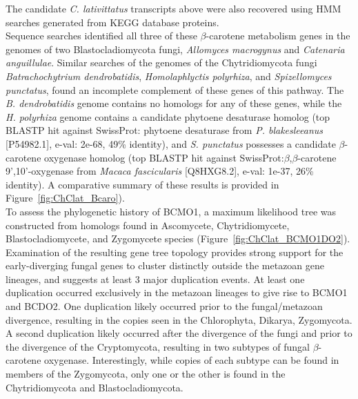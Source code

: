 \indent The candidate \textit{C. lativittatus} transcripts above were also recovered using HMM searches generated from KEGG database proteins. \\
\indent Sequence searches identified all three of these $\beta$-carotene metabolism genes in the genomes of two Blastocladiomycota fungi, \textit{Allomyces macrogynus} and \textit{Catenaria anguillulae}. Similar searches of the genomes of the Chytridiomycota fungi \textit{Batrachochytrium dendrobatidis}, \textit{Homolaphlyctis polyrhiza}, and \textit{Spizellomyces punctatus}, found an incomplete complement of these genes of this pathway. The \textit{B. dendrobatidis} genome contains no homologs for any of these genes, while the \textit{H. polyrhiza} genome contains a candidate phytoene desaturase homolog (top BLASTP hit against SwissProt: phytoene desaturase from \textit{P. blakesleeanus} [P54982.1], e-val: 2e-68, 49\% identity), and \textit{S. punctatus} possesses a candidate $\beta$-carotene oxygenase homolog (top BLASTP hit against SwissProt:$\beta$,$\beta$-carotene 9',10'-oxygenase from \textit{Macaca fascicularis} [Q8HXG8.2], e-val: 1e-37, 26\% identity). A comparative summary of these results is provided in Figure~\ref{fig:ChClat_Bcaro}). \\
\indent To assess the phylogenetic history of BCMO1, a maximum likelihood tree was constructed from homologs found in Ascomycete, Chytridiomycete, Blastocladiomycete, and Zygomycete species (Figure~\ref{fig:ChClat_BCMO1DO2}). Examination of the resulting gene tree topology provides strong support for the early-diverging fungal genes to cluster distinctly outside the metazoan gene lineages, and suggests at least 3 major duplication events. At least one duplication occurred exclusively in the metazoan lineages to give rise to BCMO1 and BCDO2. One duplication likely occurred prior to the fungal/metazoan divergence, resulting in the copies seen in the Chlorophyta, Dikarya, Zygomycota. A second duplication likely occurred after the divergence of the fungi and prior to the divergence of the Cryptomycota, resulting in two subtypes of fungal $\beta$-carotene oxygenase. Interestingly, while copies of each subtype can be found in members of the Zygomycota, only one or the other is found in the Chytridiomycota and Blastocladiomycota.\\
